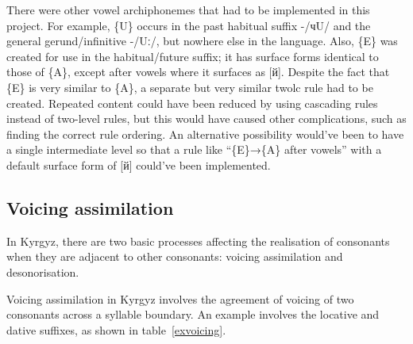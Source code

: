 \documentclass[a4paper,12pt,onecolumn,oneside]{article}
\begin{document}
\begin{table}[htbp]
	\centering
	\caption{vowel harmony for archiphoneme \{A\}}\label{vowelharmonyA}
	\hspace{2em}
\end{table}

There were other vowel archiphonemes that had to be implemented in this project.  For example, \{U\} occurs in the past habitual suffix -/чU/ and the general gerund/infinitive -/Uː/, but nowhere else in the language.  Also, \{E\} was created for use in the habitual/future suffix; it has surface forms identical to those of \{A\}, except after vowels where it surfaces as [й].  Despite the fact that \{E\} is very similar to \{A\}, a separate but very similar twolc rule had to be created.  Repeated content could have been reduced by using cascading rules instead of two-level rules, but this would have caused other complications, such as finding the correct rule ordering.  An alternative possibility would’ve been to have a single intermediate level so that a rule like ``\{E\}→\{A\} after vowels'' with a default surface form of [й] could've been implemented.


\subsection{Voicing assimilation}\label{devoicing}
In Kyrgyz, there are two basic processes affecting the realisation of consonants when they are adjacent to other consonants: voicing assimilation and desonorisation.

Voicing assimilation in Kyrgyz involves the agreement of voicing of two consonants across a syllable boundary.  An example involves the locative and dative suffixes, as shown in table~\ref{exvoicing}.
\end{document}
